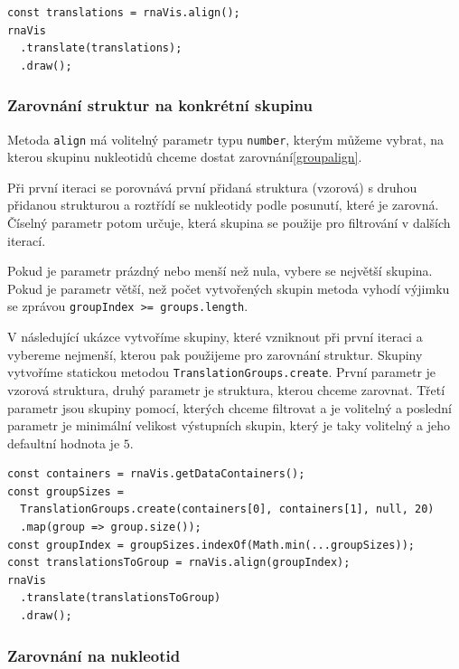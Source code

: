 \begin{lstlisting}[caption={Zarovnání struktur}, label=tsalign]
const translations = rnaVis.align();
rnaVis
  .translate(translations);
  .draw();
\end{lstlisting}

\subsubsection{Zarovnání struktur na konkrétní skupinu}

Metoda \texttt{align} má volitelný parametr typu \texttt{number}, kterým můžeme
vybrat, na kterou skupinu nukleotidů chceme dostat zarovnání\ref{groupalign}.

Při první iteraci se porovnává první přidaná struktura (vzorová) s druhou
přidanou strukturou a roztřídí se nukleotidy podle posunutí, které je zarovná.
Číselný parametr potom určuje, která skupina se použije pro filtrování v
dalších iterací. 

Pokud je parametr prázdný nebo menší než nula, vybere se největší skupina.
Pokud je parametr větší, než počet vytvořených skupin metoda vyhodí výjimku se
zprávou \texttt{groupIndex >= groups.length}. 

V následující ukázce vytvoříme skupiny, které vzniknout při první iteraci a
vybereme nejmenší, kterou pak použijeme pro zarovnání struktur. Skupiny
vytvoříme statickou metodou \texttt{TranslationGroups.create}. První parametr
je vzorová struktura, druhý parametr je struktura, kterou chceme zarovnat.
Třetí parametr jsou skupiny pomocí, kterých chceme filtrovat a je volitelný a
poslední parametr je minimální velikost výstupních skupin, který je taky
volitelný a jeho defaultní hodnota je $5$.

\begin{lstlisting}[caption={Zarovnání struktur na skupinu nukleotidů}, label=groupalign]
const containers = rnaVis.getDataContainers();
const groupSizes = 
  TranslationGroups.create(containers[0], containers[1], null, 20)
  .map(group => group.size());
const groupIndex = groupSizes.indexOf(Math.min(...groupSizes));
const translationsToGroup = rnaVis.align(groupIndex);
rnaVis
  .translate(translationsToGroup)
  .draw();
\end{lstlisting}

\subsubsection{Zarovnání na nukleotid}

